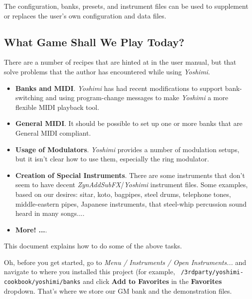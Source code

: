 \documentclass[
 11pt,
 twoside,
 a4paper,
 headinclude,
 footinclude,
 final                                 %
]{article}
\begin{document}
   The configuration, banks, presets, and instrument files can be used
   to supplement or replaces the user's own configuration and data files.

\subsection{What Game Shall We Play Today?}
\label{subsec:introduction_what_game}

   There are a number of recipes that are hinted at in the user manual, but
   that solve problems that the author has encountered while using
   \textsl{Yoshimi}.

   \begin{itemize}
      \item \textbf{Banks and MIDI}.
         \textsl{Yoshimi} has had recent modifications to support
         bank-switching and using program-change messages to make
         \textsl{Yoshimi} a more flexible MIDI playback tool.
      \item \textbf{General MIDI}.
         It should be possible to set up one or more banks that
         are General MIDI compliant.
      \item \textbf{Usage of Modulators}.
         \textsl{Yoshimi} provides a number of modulation setups,
         but it isn't clear how to use them, especially the ring modulator.
      \item \textbf{Creation of Special Instruments}.
         There are some instruments that don't seem to have
         decent \textsl{ZynAddSubFX}/\textsl{Yoshimi} instrument files.
         Some examples, based on our desires: sitar, koto, bagpipes, steel
         drums, telephone tones, middle-eastern pipes, Japanese instruments,
         that steel-whip percussion sound heard in many songs....
      \item \textbf{More! ...}.
   \end{itemize}

   This document explains how to do some of the above tasks.

   Oh, before you get started, go to
   \textsl{Menu / Instruments / Open Instruments...} and
   navigate to where you installed this project (for example,
   \texttt{~/3rdparty/yoshimi-cookbook/yoshimi/banks} and click
   \textbf{Add to Favorites} in the \textbf{Favorites} dropdown.
   That's where we store our GM bank and the demonstration files.



\end{document}
